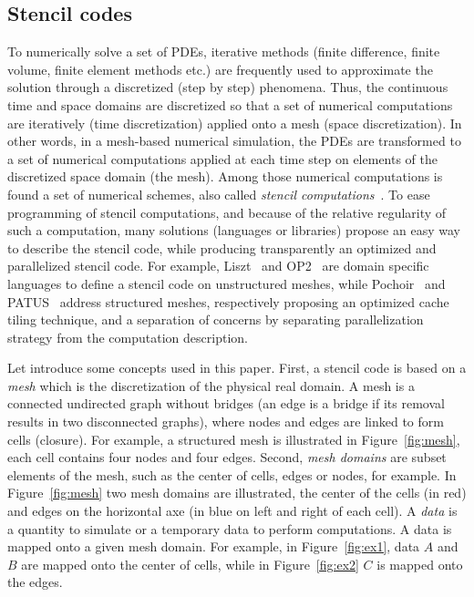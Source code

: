 \subsection{Stencil codes}
\label{sect:stencil}
To numerically solve a set of PDEs, iterative methods (finite difference, finite volume, finite element methods etc.) are frequently used to approximate the solution through a discretized (step by step) phenomena. Thus, the continuous time and space domains are discretized so that a set of numerical computations are iteratively (time discretization) applied onto a mesh (space discretization). In other words, in a mesh-based numerical simulation, the PDEs are transformed to a set of numerical computations applied at each time step on elements of the discretized space domain (the mesh). Among those numerical computations is found a set of numerical schemes, also called \textit{stencil computations}~\cite{spaaTangCKLL11}. To ease programming of stencil computations, and because of the relative regularity of such a computation, many solutions (languages or libraries) propose an easy way to describe the stencil code, while producing transparently an optimized and parallelized stencil code. For example, Liszt~\cite{DeVito2011LDS} and OP2~\cite{Giles2011} are domain specific languages to define a stencil code on unstructured meshes, while Pochoir~\cite{spaaTangCKLL11} and PATUS~\cite{citeulike12258902} address structured meshes, respectively proposing an optimized cache tiling technique, and a separation of concerns by separating parallelization strategy from the computation description.

Let introduce some concepts used in this paper. First, a stencil code is based on a \emph{mesh} which is the discretization of the physical real domain. A mesh is a connected undirected graph without bridges (an edge is a bridge if its removal results in two disconnected graphs), where nodes and edges are linked to form cells (closure). For example, a structured mesh is illustrated in Figure~\ref{fig:mesh}, each cell contains four nodes and four edges. Second, \emph{mesh domains} are subset elements of the mesh, such as the center of cells, edges or nodes, for example. In Figure~\ref{fig:mesh} two mesh domains are illustrated, the center of the cells (in red) and edges on the horizontal axe (in blue on left and right of each cell). A \emph{data} is a quantity to simulate or a temporary data to perform computations. A data is mapped onto a given mesh domain. For example, in Figure~\ref{fig:ex1}, data $A$ and $B$ are mapped onto the center of cells, while in Figure~\ref{fig:ex2} $C$ is mapped onto the edges.

